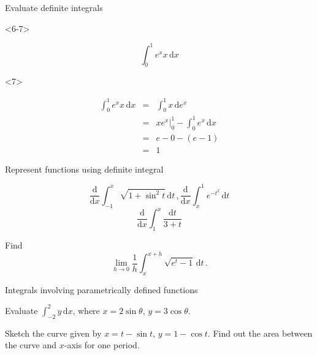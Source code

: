 \begin{frame}{Evaluate definite integrals}
\begin{onlyenv}
\end{onlyenv}



\begin{onlyenv}<6-7>

\begin{example}
\[
\int_{0}^{1}e^{x}x\,\mathrm{d}x
\]
\end{example}

\begin{uncoverenv}<7>

\begin{sol}
{\scriptsize{}
\begin{eqnarray*}
\int_{0}^{1}e^{x}x\,\mathrm{d}x & = & \int_{0}^{1}x\,\mathrm{d}e^{x}\\
 & = & xe^{x}\bigg|_{0}^{1}-\int_{0}^{1}e^{x}\,\mathrm{d}x\\
 & = & e-0-\left(e-1\right)\\
 & = & 1
\end{eqnarray*}
}{\scriptsize \par}
\end{sol}
\end{uncoverenv}

\end{onlyenv}

\end{frame}

\begin{frame}{Represent functions using definite integral}

\begin{example}
\[
\frac{\mathrm{d}}{\mathrm{d}x}\int_{-1}^{x}\sqrt{1+\sin^{2}t}\,\mathrm{d}t\,,\frac{\mathrm{d}}{\mathrm{d}x}\int_{x}^{1}e^{-t^{2}}\,\mathrm{d}t
\]
\[
\frac{\mathrm{d}}{\mathrm{d}x}\int_{1}^{x}\frac{\mathrm{d}t}{3+t}
\]

\end{example}



\begin{example}
Find 
\[
\lim_{h\to0}\frac{1}{h}\int_{x}^{x+h}\sqrt{e^{t}-1}\,\mathrm{d}t\,.
\]

\end{example}

\end{frame}

\begin{frame}{Integrals involving parametrically defined functions}

\begin{example}
Evaluate $\int_{-2}^{2}y\,\mathrm{d}x$, where $x=2\sin\theta$, $y=3\cos\theta$.
\end{example}


\pause{}
\begin{example}
Sketch the curve given by $x=t-\sin t$, $y=1-\cos t$. Find out the
area between the curve and $x$-axis for one period.
\end{example}

\end{frame}

